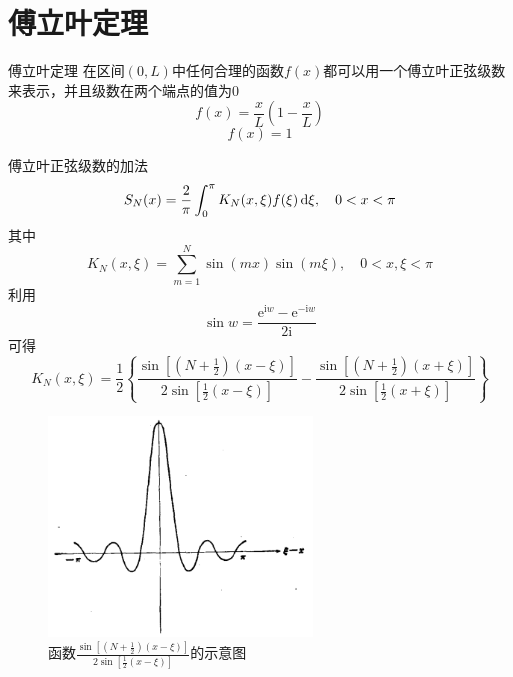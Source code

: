 \documentclass[10pt]{beamer}
\newcommand\mi{\mathrm{i}}
\newcommand\me{\mathrm{e}}
\begin{document}
\section{傅立叶定理}

\begin{frame}{傅立叶定理}
  在区间$(0,L)$中任何合理的函数$f(x)$都可以用一个傅立叶正弦级数来表示，并且级数在两个端点的值为0
  \begin{equation}
    f(x)=\frac{x}{L}\left(1-\frac{x}{L}\right)
  \end{equation}
  \begin{equation}
    f(x) = 1
  \end{equation}
\end{frame}

\begin{frame}[allowframebreaks]{傅立叶正弦级数的加法}
  \begin{equation}
    S_{N}(x)=\frac{2}{\pi} \int_{0}^{\pi} K_{N}(x, \xi) f(\xi) \dif  \xi,\quad 0<x<\pi
    \label{eq:2Sn}
  \end{equation}
  其中
  \begin{equation}
    K_{N}(x, \xi)=\sum_{m=1}^{N} \sin (m x) \sin (m \xi),\quad 0<x, \xi<\pi
  \end{equation}
  利用
  \begin{equation}
    \sin w=\frac{\me^{\mi w}-\me^{-\mi w}}{2 \mi}
  \end{equation}
  可得
  \begin{equation}
    K_{N}(x, \xi)=\frac{1}{2}\left\{\frac{\sin \left[\left(N+\frac{1}{2}\right)(x-\xi)\right]}{2 \sin \left[\frac{1}{2}(x-\xi)\right]}-\frac{\sin \left[\left(N+\frac{1}{2}\right)(x+\xi)\right]}{2 \sin \left[\frac{1}{2}(x+\xi)\right]}\right\}
    \label{eq:2Kn}
  \end{equation}

  \begin{figure}
    \centering
    \includegraphics[width=7cm]{21.png}
    \caption{函数$\frac{\sin \left[\left(N+\frac{1}{2}\right)(x-\xi)\right]}{2 \sin \left[\frac{1}{2}(x-\xi)\right]}$的示意图}
    \label{fig:21}
  \end{figure}
  

\end{frame}
\end{document}
